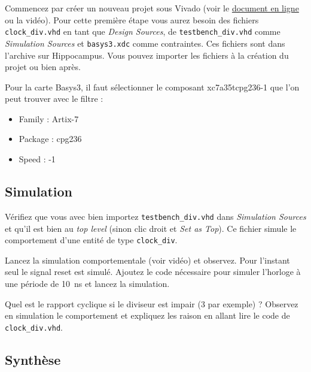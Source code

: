 \documentclass[11pt]{paper}
\begin{document}
Commencez par créer un nouveau projet sous Vivado (voir le \href{https://hippocampus.ec-nantes.fr/pluginfile.php/76485/mod_resource/content/4/TUTO%20VIVADO.pdf}{document en ligne} ou la vidéo). 
Pour cette première étape vous aurez besoin des fichiers {\tt clock\_div.vhd} %
en tant que {\it Design Sources}, de {\tt testbench\_div.vhd} comme {\it Simulation Sources} et {\tt basys3.xdc} comme contraintes. Ces fichiers sont dans l'archive sur Hippocampus. Vous pouvez importer les fichiers à la création du projet ou bien après.

Pour la carte Basys3, il faut sélectionner le composant \og xc7a35tcpg236-1 \fg que l'on peut trouver avec le filtre :
\begin{itemize}
	\item Family : Artix-7
	\item Package : cpg236
	\item Speed : -1
\end{itemize}


\subsection{Simulation}

Vérifiez que vous avec bien importez {\tt testbench\_div.vhd} dans {\it Simulation Sources} et qu'il est bien au {\it top level} (sinon clic droit et {\it Set as Top}). Ce fichier simule le comportement d'une entité de type {\tt clock\_div}.

Lancez la simulation comportementale (voir vidéo) et observez. Pour l'instant seul le signal reset est simulé. Ajoutez le code nécessaire pour simuler l'horloge à une période de 10~ns et lancez la simulation.



Quel est le rapport cyclique si le diviseur est impair (3 par exemple) ? Observez en simulation le comportement et expliquez les raison en allant lire le code de {\tt clock\_div.vhd}.


\subsection{Synthèse}
\end{document}

